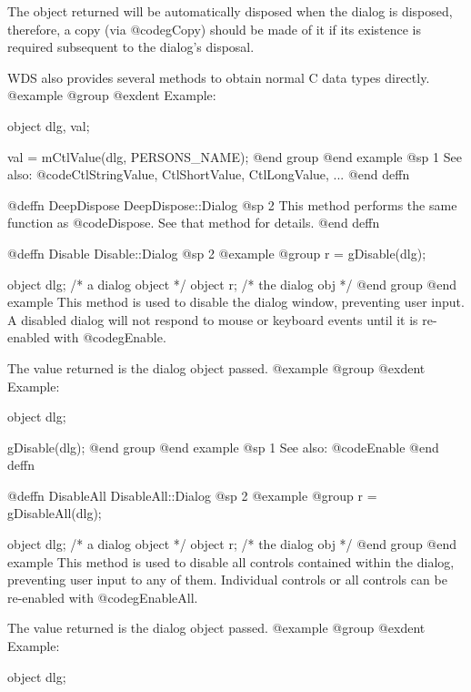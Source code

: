 The object returned will be automatically disposed when the dialog is
disposed, therefore, a copy (via @code{gCopy}) should be made of it if
its existence is required subsequent to the dialog's disposal.

WDS also provides several methods to obtain normal C data types directly.
@example
@group
@exdent Example:

object  dlg, val;

val = mCtlValue(dlg, PERSONS_NAME);
@end group
@end example
@sp 1
See also:  @code{CtlStringValue, CtlShortValue, CtlLongValue, ...}
@end deffn












@deffn {DeepDispose} DeepDispose::Dialog
@sp 2
This method performs the same function as @code{Dispose}.  See that
method for details.
@end deffn









@deffn {Disable} Disable::Dialog
@sp 2
@example
@group
r = gDisable(dlg);

object  dlg;   /*  a dialog object  */
object  r;     /*  the dialog obj   */
@end group
@end example
This method is used to disable the dialog window, preventing user input.
A disabled dialog will not respond to mouse or keyboard events until
it is re-enabled with @code{gEnable}.

The value returned is the dialog object passed.
@example
@group
@exdent Example:

object  dlg;

gDisable(dlg);
@end group
@end example
@sp 1
See also:  @code{Enable}
@end deffn




@deffn {DisableAll} DisableAll::Dialog
@sp 2
@example
@group
r = gDisableAll(dlg);

object  dlg;   /*  a dialog object  */
object  r;     /*  the dialog obj   */
@end group
@end example
This method is used to disable all controls contained within the dialog,
preventing user input to any of them.  Individual controls or all controls
can be re-enabled with @code{gEnableAll}.

The value returned is the dialog object passed.
@example
@group
@exdent Example:

object  dlg;

